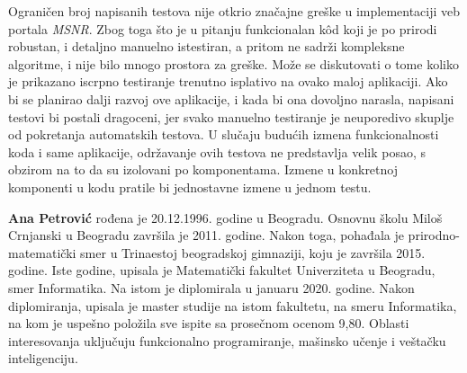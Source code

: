 \documentclass[12pt,oneside]{memoir}
\begin{document}
\par Ograničen broj napisanih testova nije otkrio značajne greške u implementaciji veb portala \emph{MSNR}. Zbog toga što je u pitanju funkcionalan k\^{o}d koji je po prirodi robustan, i detaljno manuelno istestiran, a pritom ne sadrži kompleksne algoritme, i nije bilo mnogo prostora za greške. Može se diskutovati o tome koliko je prikazano iscrpno testiranje trenutno isplativo na ovako maloj aplikaciji. Ako bi se planirao dalji razvoj ove aplikacije, i kada bi ona dovoljno narasla, napisani testovi bi postali dragoceni, jer svako manuelno testiranje je neuporedivo skuplje od pokretanja automatskih testova. U slučaju budućih izmena funkcionalnosti koda i same aplikacije, održavanje ovih testova ne predstavlja velik posao, s obzirom na to da su izolovani po komponentama. Izmene u konkretnoj komponenti u kodu pratile bi jednostavne izmene u jednom testu.





\literatura

\backmatter

\begin{biografija}
\textbf{Ana Petrović} rođena je 20.12.1996. godine u Beogradu. Osnovnu školu Miloš Crnjanski u Beogradu završila je 2011. godine. Nakon toga, pohađala je prirodno-matematički smer u Trinaestoj beogradskoj gimnaziji, koju je završila 2015. godine. Iste godine, upisala je Matematički fakultet Univerziteta u Beogradu, smer Informatika. Na istom je diplomirala u januaru 2020. godine. Nakon diplomiranja, upisala je master studije na istom fakultetu, na smeru Informatika, na kom je uspešno položila sve ispite sa prosečnom ocenom 9,80. Oblasti interesovanja uključuju funkcionalno programiranje, mašinsko učenje i veštačku inteligenciju.
\end{biografija}
\end{document}
